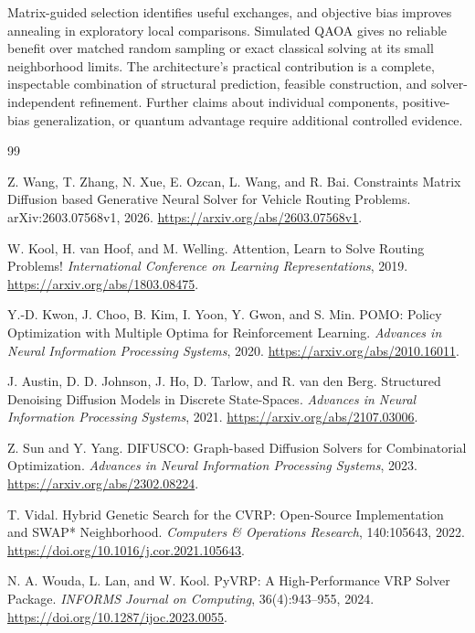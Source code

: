 \documentclass[11pt,a4paper]{article}
\begin{document}
Matrix-guided selection identifies useful exchanges, and objective bias
improves annealing in exploratory local comparisons. Simulated QAOA gives
no reliable benefit over matched random sampling or exact classical
solving at its small neighborhood limits. The architecture's practical
contribution is a complete, inspectable combination of structural
prediction, feasible construction, and solver-independent refinement.
Further claims about individual components, positive-bias generalization,
or quantum advantage require additional controlled evidence.

\begin{thebibliography}{99}

Z. Wang, T. Zhang, N. Xue, E. Ozcan, L. Wang, and R. Bai.
\newblock Constraints Matrix Diffusion based Generative Neural Solver for
Vehicle Routing Problems.
\newblock arXiv:2603.07568v1, 2026.
\newblock \url{https://arxiv.org/abs/2603.07568v1}.

W. Kool, H. van Hoof, and M. Welling.
\newblock Attention, Learn to Solve Routing Problems!
\newblock \emph{International Conference on Learning Representations}, 2019.
\newblock \url{https://arxiv.org/abs/1803.08475}.

Y.-D. Kwon, J. Choo, B. Kim, I. Yoon, Y. Gwon, and S. Min.
\newblock POMO: Policy Optimization with Multiple Optima for Reinforcement
Learning.
\newblock \emph{Advances in Neural Information Processing Systems}, 2020.
\newblock \url{https://arxiv.org/abs/2010.16011}.

J. Austin, D. D. Johnson, J. Ho, D. Tarlow, and R. van den Berg.
\newblock Structured Denoising Diffusion Models in Discrete State-Spaces.
\newblock \emph{Advances in Neural Information Processing Systems}, 2021.
\newblock \url{https://arxiv.org/abs/2107.03006}.

Z. Sun and Y. Yang.
\newblock DIFUSCO: Graph-based Diffusion Solvers for Combinatorial Optimization.
\newblock \emph{Advances in Neural Information Processing Systems}, 2023.
\newblock \url{https://arxiv.org/abs/2302.08224}.

T. Vidal.
\newblock Hybrid Genetic Search for the CVRP: Open-Source Implementation and
SWAP* Neighborhood.
\newblock \emph{Computers \& Operations Research}, 140:105643, 2022.
\newblock \url{https://doi.org/10.1016/j.cor.2021.105643}.

N. A. Wouda, L. Lan, and W. Kool.
\newblock PyVRP: A High-Performance VRP Solver Package.
\newblock \emph{INFORMS Journal on Computing}, 36(4):943--955, 2024.
\newblock \url{https://doi.org/10.1287/ijoc.2023.0055}.


\end{thebibliography}
\end{document}
